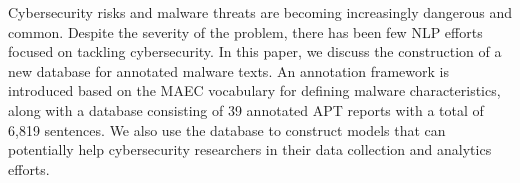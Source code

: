 Cybersecurity risks and malware threats are becoming increasingly dangerous and common. Despite the severity of the problem, there has been few NLP efforts focused on tackling cybersecurity. In this paper, we discuss the construction of a new database for annotated malware texts. An annotation framework is introduced based on the MAEC vocabulary for defining malware characteristics, along with a database consisting of 39 annotated APT reports with a total of 6,819 sentences. We also use the database to construct models that can potentially help cybersecurity researchers in their data collection and analytics efforts.
